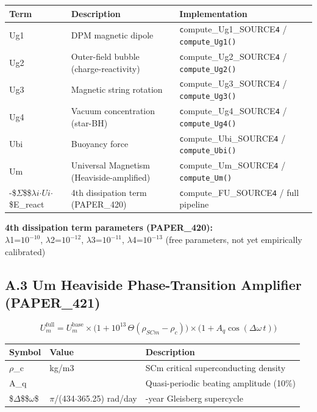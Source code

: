 \documentclass[12pt,a4paper]{article}
\begin{document}
\begin{table}[H]
\centering
\small
\begin{tabularx}{\linewidth}{@{}>{\raggedright\arraybackslash}X>{\raggedright\arraybackslash}X>{\raggedright\arraybackslash}X@{}}
\toprule
Term & Description & Implementation \tabularnewline
\midrule
Ug1 & DPM magnetic dipole & \texttt{c}ompute\_{Ug1\_SOURCE}\texttt{4} / \texttt{compute\_Ug1()} \tabularnewline
Ug2 & Outer-field bubble (charge-reactivity) & \texttt{c}ompute\_{Ug2\_SOURCE}\texttt{4} / \texttt{compute\_Ug2()} \tabularnewline
Ug3 & Magnetic string rotation & \texttt{c}ompute\_{Ug3\_SOURCE}\texttt{4} / \texttt{compute\_Ug3()} \tabularnewline
Ug4 & Vacuum concentration (star-BH) & \texttt{c}ompute\_{Ug4\_SOURCE}\texttt{4} / \texttt{compute\_Ug4()} \tabularnewline
Ubi & Buoyancy force & \texttt{c}ompute\_{Ubi\_SOURCE}\texttt{4} / \texttt{compute\_Ubi()} \tabularnewline
Um & Universal Magnetism (Heaviside-amplified) & \texttt{c}ompute\_{Um\_SOURCE}\texttt{4} / \texttt{compute\_Um()} \tabularnewline
-\$$\Sigma$\$\$$\lambda$$i$$\cdot$$Ui$$\cdot$\$E\_react & 4th dissipation term (PAPER\_420) & \texttt{c}ompute\_{FU\_SOURCE}\texttt{4} / full pipeline \tabularnewline
\bottomrule
\end{tabularx}
\end{table}

\textbf{4th dissipation term parameters (PAPER\_420):} \\  $\lambda$1=$10^{-10}$, $\lambda$2=$10^{-12}$, $\lambda$3=$10^{-11}$, $\lambda$4=$10^{-13}$ (free parameters, not yet empirically calibrated)

\subsection{A.3 Um Heaviside Phase-Transition Amplifier (PAPER\_421)}

\begin{equation}
U_m^{\mathrm{full}} = U_m^{\mathrm{base}} \times \bigl(1 + 10^{13}\,\Theta(\rho_{SCm} - \rho_c)\bigr) \times \bigl(1 + A_q\cos(\Delta\omega\,t)\bigr)
\end{equation}

\begin{table}[H]
\centering
\small
\begin{tabularx}{\linewidth}{@{}>{\raggedright\arraybackslash}X>{\raggedright\arraybackslash}X>{\raggedright\arraybackslash}X@{}}
\toprule
Symbol & Value & Description \tabularnewline
\midrule
$\rho$\_c & 1015 kg/m3 & SCm critical superconducting density \tabularnewline
A\_q & 0.1 & Quasi-periodic beating amplitude (10\%) \tabularnewline
\$$\Delta$\$\$$\omega$\$ & 2$\pi$/(434$\cdot$365.25) rad/day & 434-year Gleisberg supercycle \tabularnewline
\bottomrule
\end{tabularx}
\end{table}
\end{document}
